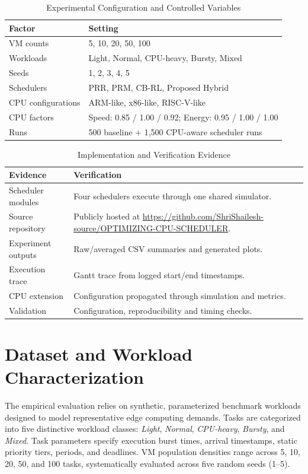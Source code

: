 \documentclass[conference]{IEEEtran}
\providecommand{\toprule}{\hline\hline}
\providecommand{\midrule}{\hline}
\providecommand{\bottomrule}{\hline\hline}
\begin{document}
\begin{table}[htbp]
\caption{Experimental Configuration and Controlled Variables}
\begin{center}
\begin{tabular}{ll}
\toprule
\textbf{Factor} & \textbf{Setting} \\
\midrule
VM counts & 5, 10, 20, 50, 100 \\
Workloads & Light, Normal, CPU-heavy, Bursty, Mixed \\
Seeds & 1, 2, 3, 4, 5 \\
Schedulers & PRR, PRM, CB-RL, Proposed Hybrid \\
CPU configurations & ARM-like, x86-like, RISC-V-like \\
CPU factors & Speed: 0.85 / 1.00 / 0.92; Energy: 0.95 / 1.00 / 1.00 \\
Runs & 500 baseline + 1,500 CPU-aware scheduler runs \\
\bottomrule
\end{tabular}
\label{tab:config}
\end{center}
\end{table}

\begin{table}[htbp]
\caption{Implementation and Verification Evidence}
\begin{center}
\begin{tabular}{lp{5.5cm}}
\toprule
\textbf{Evidence} & \textbf{Verification} \\
\midrule
Scheduler modules & Four schedulers execute through one shared simulator. \\
Source repository & Publicly hosted at \url{https://github.com/ShriShailesh-source/OPTIMIZING-CPU-SCHEDULER}. \\
Experiment outputs & Raw/averaged CSV summaries and generated plots. \\
Execution trace & Gantt trace from logged start/end timestamps. \\
CPU extension & Configuration propagated through simulation and metrics. \\
Validation & Configuration, reproducibility and timing checks. \\
\bottomrule
\end{tabular}
\label{tab:evidence}
\end{center}
\end{table}

\section{Dataset and Workload Characterization}
The empirical evaluation relies on synthetic, parameterized benchmark workloads designed to model representative edge computing demands. Tasks are categorized into five distinctive workload classes: \textit{Light}, \textit{Normal}, \textit{CPU-heavy}, \textit{Bursty}, and \textit{Mixed}. Task parameters specify execution burst times, arrival timestamps, static priority tiers, periods, and deadlines. VM population densities range across 5, 10, 20, 50, and 100 tasks, systematically evaluated across five random seeds (1--5).
\end{document}
